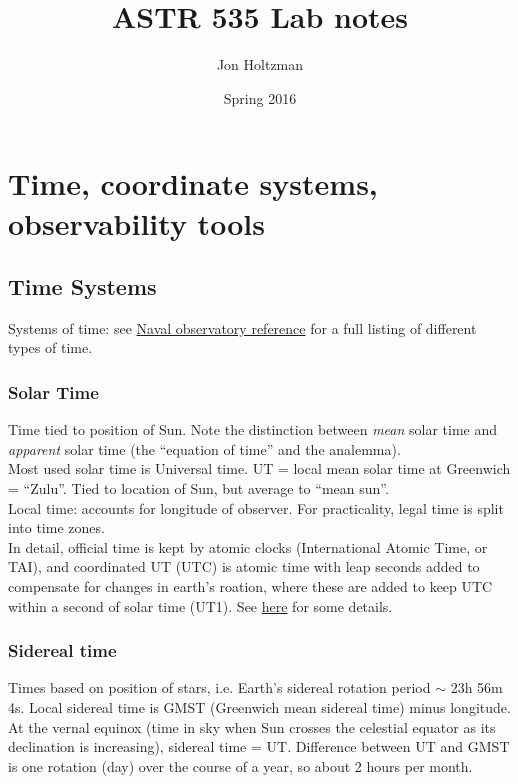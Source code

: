 \documentclass[12pt]{article}
\title{ASTR 535 Lab notes}
\author{Jon Holtzman}
\date{Spring 2016}
\begin{document}
\maketitle

\section*{Time, coordinate systems, observability tools}
\subsection*{Time Systems}
Systems of time: see \textcolor{blue}{\href{tycho.usno.navy.mil/systime.html}
        {Naval observatory reference}}
        for a full listing of different types of time.
\subsubsection*{Solar Time}
Time tied to position of Sun. Note the distinction
between \emph{mean} solar time and \emph{apparent}
solar time (the ``equation of time'' and the analemma).\\

\noindent Most used solar time is Universal time.
UT = local mean solar time at Greenwich = ``Zulu''.
Tied to location of Sun, but average to ``mean sun''.\\

\noindent Local time: accounts for longitude of observer.
For practicality, legal time is split into time zones.\\

\noindent In detail, official time is kept by atomic clocks
(International Atomic Time, or TAI), and coordinated UT
(UTC) is atomic time with leap seconds added to compensate
for changes in earth's roation, where these are added to
keep UTC within a second of solar time (UT1).
See \textcolor{blue}
{\href{https://en.wikipedia.org/wiki/Universal_Time}
{here}} for some details.

\subsubsection*{Sidereal time}
Times based on position of stars, i.e. Earth's sidereal
rotation period $\sim$ 23h 56m 4s. Local sidereal time is GMST
(Greenwich mean sidereal time) minus longitude. At the vernal
equinox (time in sky when Sun crosses the celestial equator
as its declination is increasing), sidereal time = UT.
Difference between UT and GMST is one rotation (day) over
the course of a year, so about 2 hours per month.\\
\end{document}

